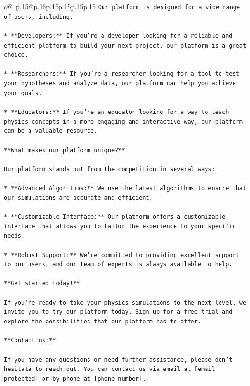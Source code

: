 \documentclass{article}
\begin{document}
{\begin{supertabular}{c@{$\;$}|p{.15\linewidth}@{}p{.15\linewidth}p{.15\linewidth}p{.15\linewidth}p{.15\linewidth}p{.15\linewidth}}
{{{\texttt{Our platform is designed for a wide range of users, including:} \\
\\ 
\texttt{* **Developers:** If you're a developer looking for a reliable and efficient platform to build your next project, our platform is a great choice.} \\
\\ 
\texttt{* **Researchers:** If you're a researcher looking for a tool to test your hypotheses and analyze data, our platform can help you achieve your goals.} \\
\\ 
\texttt{* **Educators:** If you're an educator looking for a way to teach physics concepts in a more engaging and interactive way, our platform can be a valuable resource.} \\
\\ 
\texttt{**What makes our platform unique?**} \\
\\ 
\texttt{Our platform stands out from the competition in several ways:} \\
\\ 
\texttt{* **Advanced Algorithms:** We use the latest algorithms to ensure that our simulations are accurate and efficient.} \\
\\ 
\texttt{* **Customizable Interface:** Our platform offers a customizable interface that allows you to tailor the experience to your specific needs.} \\
\\ 
\texttt{* **Robust Support:** We're committed to providing excellent support to our users, and our team of experts is always available to help.} \\
\\ 
\texttt{**Get started today!**} \\
\\ 
\texttt{If you're ready to take your physics simulations to the next level, we invite you to try our platform today. Sign up for a free trial and explore the possibilities that our platform has to offer.} \\
\\ 
\texttt{**Contact us:**} \\
\\ 
\texttt{If you have any questions or need further assistance, please don't hesitate to reach out. You can contact us via email at {[}email protected{]} or by phone at {[}phone number{]}.} \\
}}}
\end{supertabular}}
\end{document}
